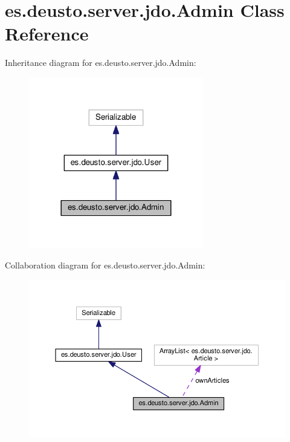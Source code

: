 \hypertarget{classes_1_1deusto_1_1server_1_1jdo_1_1_admin}{}\section{es.\+deusto.\+server.\+jdo.\+Admin Class Reference}
\label{classes_1_1deusto_1_1server_1_1jdo_1_1_admin}


Inheritance diagram for es.\+deusto.\+server.\+jdo.\+Admin\+:\nopagebreak
\begin{figure}[H]
\begin{center}
\leavevmode
\includegraphics[width=216pt]{classes_1_1deusto_1_1server_1_1jdo_1_1_admin__inherit__graph}
\end{center}
\end{figure}


Collaboration diagram for es.\+deusto.\+server.\+jdo.\+Admin\+:\nopagebreak
\begin{figure}[H]
\begin{center}
\leavevmode
\includegraphics[width=350pt]{classes_1_1deusto_1_1server_1_1jdo_1_1_admin__coll__graph}
\end{center}
\end{figure}
